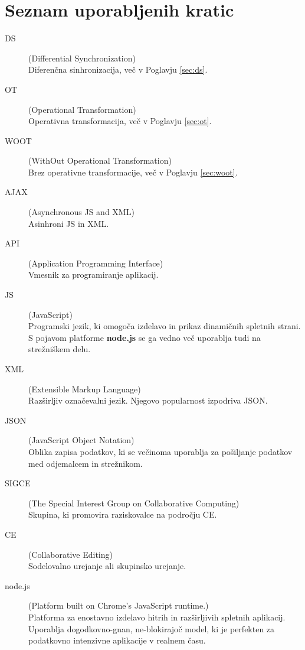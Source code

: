\documentclass[a4paper, 12pt, twoside]{book}
\begin{document}
\chapter*{Seznam uporabljenih kratic}
\begin{description}
    \item[DS] (Differential Synchronization) \\Diferenčna sinhronizacija, več v Poglavju \ref{sec:ds}.
	\item[OT] (Operational Transformation) \\Operativna transformacija, več v Poglavju \ref{sec:ot}.
	\item[WOOT] (WithOut Operational Transformation) \\Brez operativne transformacije, več v Poglavju \ref{sec:woot}.
	\item[AJAX] (Asynchronous JS and XML) \\Asinhroni JS in XML.
	\item[API] (Application Programming Interface) \\Vmesnik za programiranje aplikacij.
	\item[JS] (JavaScript) \\Programski jezik, ki omogoča izdelavo in prikaz dinamičnih spletnih strani. S pojavom platforme \textbf{node.js} se ga vedno več uporablja tudi na strežniškem delu.
	\item[XML] (Extensible Markup Language) \\Razširljiv označevalni jezik. Njegovo popularnost izpodriva JSON.
    \item[JSON] (JavaScript Object Notation) \\Oblika zapisa podatkov, ki se večinoma uporablja za pošiljanje podatkov med odjemalcem in strežnikom.
	\item[SIGCE] (The Special Interest Group on Collaborative Computing) \\Skupina, ki promovira raziskovalce na področju CE.
    \item[CE] (Collaborative Editing) \\Sodelovalno urejanje ali skupinsko urejanje.
    \item[node.js] (Platform built on Chrome's JavaScript runtime.) \\Platforma za enostavno izdelavo hitrih in razširljivih spletnih aplikacij. Uporablja dogodkovno-gnan, ne-blokirajoč model, ki je perfekten za podatkovno intenzivne aplikacije v realnem času.
\end{description}
\end{document}

